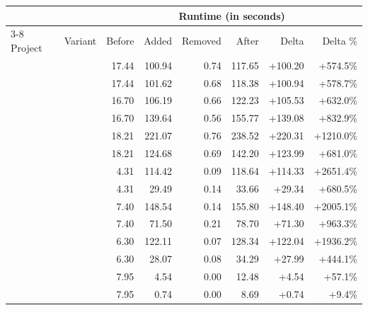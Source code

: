   \begin{tabular*}{\linewidth}{@{\hspace{\tabcolsep}\extracolsep{\fill}}llrrrrrr}
  \toprule
   &  & \multicolumn{6}{c}{Runtime (in seconds)} \\
  \cmidrule(lr){3-8}
  Project & Variant & Before & Added & Removed & After & Delta & Delta \% \\
  \midrule
  \DatasetEqBenchA{} & \VariantNaiveC{} & 17.44 & 100.94 & 0.74 & 117.65 & +100.20 & +574.5\% \\
  \DatasetEqBenchA{} & \VariantImprovedC{} & 17.44 & 101.62 & 0.68 & 118.38 & +100.94 & +578.7\% \\
  \DatasetEqBenchB{} & \VariantNaiveC{} & 16.70 & 106.19 & 0.66 & 122.23 & +105.53 & +632.0\% \\
  \DatasetEqBenchB{} & \VariantImprovedC{} & 16.70 & 139.64 & 0.56 & 155.77 & +139.08 & +832.9\% \\
  \DatasetEqBenchC{} & \VariantNaiveC{} & 18.21 & 221.07 & 0.76 & 238.52 & +220.31 & +1210.0\% \\
  \DatasetEqBenchC{} & \VariantImprovedC{} & 18.21 & 124.68 & 0.69 & 142.20 & +123.99 & +681.0\% \\
  \midrule
  \DatasetCommonsA{} & \VariantNaiveC{} & 4.31 & 114.42 & 0.09 & 118.64 & +114.33 & +2651.4\% \\
  \DatasetCommonsA{} & \VariantImprovedC{} & 4.31 & 29.49 & 0.14 & 33.66 & +29.34 & +680.5\% \\
  \DatasetCommonsB{} & \VariantNaiveC{} & 7.40 & 148.54 & 0.14 & 155.80 & +148.40 & +2005.1\% \\
  \DatasetCommonsB{} & \VariantImprovedC{} & 7.40 & 71.50 & 0.21 & 78.70 & +71.30 & +963.3\% \\
  \DatasetCommonsC{} & \VariantNaiveC{} & 6.30 & 122.11 & 0.07 & 128.34 & +122.04 & +1936.2\% \\
  \DatasetCommonsC{} & \VariantImprovedC{} & 6.30 & 28.07 & 0.08 & 34.29 & +27.99 & +444.1\% \\
  \midrule
  \DatasetCommonsDev{} & \VariantNaiveC{} & 7.95 & 4.54 & 0.00 & 12.48 & +4.54 & +57.1\% \\
  \DatasetCommonsDev{} & \VariantImprovedC{} & 7.95 & 0.74 & 0.00 & 8.69 & +0.74 & +9.4\% \\
  \bottomrule
  \end{tabular*}

